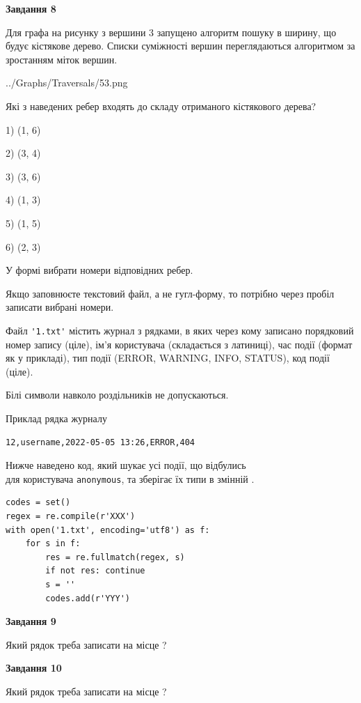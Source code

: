 \documentclass[12pt, ukrainian]{article}
\def\code#1{\Verb!#1!}
\begin{document}
{\begin {large}
{\begin {center}\textbf{Завдання 8}\end {center}}\par
Для графа на рисунку з вершини 3 запущено алгоритм пошуку в ширину, що будує кістякове дерево. Списки суміжності вершин переглядаються алгоритмом за зростанням міток вершин.\par
\begin{center}
	{../Graphs/Traversals/53.png}
\end{center}
\par Які з наведених ребер входять до складу отриманого кістякового дерева?\par
1) (1, 6)\par
2) (3, 4)\par
3) (3, 6)\par
4) (1, 3)\par
5) (1, 5)\par
6) (2, 3)\par
{\vskip 15pt} У формі вибрати номери відповідних ребер.


Якщо заповнюєте текстовий файл, а не гугл-форму, то потрібно через пробіл записа\-ти вибрані номери.\par
\newpage


Файл \code{'1.txt'} містить журнал з рядками, в яких через кому записано поряд\-ко\-вий номер запису (ціле), ім'я користувача (складається з латиниці), час події (фор\-мат як у прикладі), тип події (ERROR, WARNING, INFO, STATUS), код події (ціле).

Білі символи навколо роздільників не допускаються.

Приклад рядка журналу



\begin{verbatim}
12,username,2022-05-05 13:26,ERROR,404
\end{verbatim}


Нижче наведено код, який шукає усі події, що відбулись\\ для користувача \code{anonymous}, та зберігає їх типи в змінній .



\begin{verbatim}
codes = set()
regex = re.compile(r'XXX')
with open('1.txt', encoding='utf8') as f:
    for s in f:
        res = re.fullmatch(regex, s)
        if not res: continue
        s = ''
        codes.add(r'YYY')
\end{verbatim}


{\begin {center}\textbf{Завдання 9}\end {center}}\par
Який рядок треба записати на місце  ?\par
\vspace{5mm}


{\begin {center}\textbf{Завдання 10}\end {center}}\par
Який рядок треба записати на місце  ?\par


\newpage


\end {large}}
\end{document}
